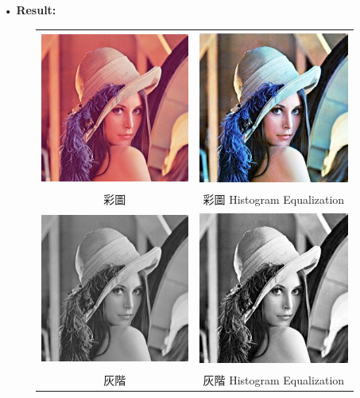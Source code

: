 \documentclass[12pt,a4paper]{article}
\begin{document}
\begin{enumerate}
\newpage
\item[•]
{\bf Result:}
\begin{figure}[h]
\hspace*{5em}
\begin{tabular}{cc}
\includegraphics[height=2in]{input_image.jpg}&
\includegraphics[height=2in]{input_image_HE.jpg}\\
彩圖  & 彩圖 Histogram Equalization \vspace*{1em}\\
\includegraphics[height=2in]{gray_image.jpg}&
\includegraphics[height=2in]{gray_image_HE.jpg}\\
灰階  & 灰階 Histogram Equalization\\
\end{tabular}
\end{figure} 




\end{enumerate}
\end{document}
